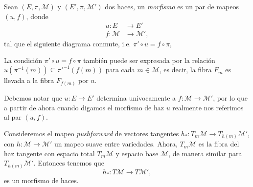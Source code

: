 
\begin{mydef}[Morfismo]
Sean $(E, \pi, \mathcal{M})$ y $(E', \pi, \mathcal{M}')$ dos haces, un \emph{morfismo} es un par de mapeos $(u, f)$, donde
%
\begin{align*}
u: E & \longrightarrow E' \\
f: \mathcal{M} & \longrightarrow \mathcal{M}',
\end{align*}
%
tal que el siguiente diagrama conmute, i.e. $\pi' \circ u = f \circ \pi$,
%
\begin{center}
\end{center}
%
\end{mydef}

\begin{obs}
La condici\'{o}n $\pi' \circ u = f \circ \pi$ tambi\'{e}n puede ser expresada por la relaci\'{o}n $u(\pi^{-1}(m)) \subseteq \pi'^{-1}(f(m))$ para cada $m \in \mathcal{M}$, es decir, la fibra $F_{m}$ es llevada a la fibra $F_{f(m)}$ por $u$.
\end{obs}

\begin{obs}
Debemos notar que $u: E \longrightarrow E'$ determina un\'{i}vocamente a $f: \mathcal{M} \longrightarrow \mathcal{M}'$, por lo que a partir de ahora cuando digamos el morfismo de haz $u$ realmente nos referimos al par  $(u, f)$.
\end{obs}

\begin{ex}
Consideremos el mapeo \emph{pushforward} de vectores tangentes $h_{\ast}: T_{m}\mathcal{M} \longrightarrow T_{h(m)}\mathcal{M}'$, con $h: \mathcal{M} \longrightarrow \mathcal{M}'$ un mapeo suave entre variedades. Ahora, $T_{m}\mathcal{M}$ es la fibra del haz tangente con espacio total $T_{m}\mathcal{M}$ y espacio base $\mathcal{M}$, de manera similar para $T_{h(m)}\mathcal{M}'$. Entonces tenemos que $$h_{\ast}: T \mathcal{M} \longrightarrow T \mathcal{M}',$$ es un morfismo de haces.
\end{ex}

